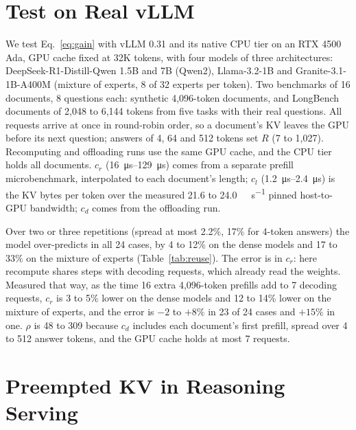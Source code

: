\documentclass[journal]{IEEEtran}
\begin{document}
\section{Test on Real vLLM}
\label{sec:real}
We test Eq.~\ref{eq:gain} with vLLM 0.31 and its native CPU tier on an RTX 4500 Ada, GPU cache fixed
at 32K tokens, with four models of three architectures: DeepSeek-R1-Distill-Qwen 1.5B and 7B
(Qwen2), Llama-3.2-1B and Granite-3.1-1B-A400M (mixture of experts, 8 of 32 experts per token). Two
benchmarks of 16 documents, 8 questions each: synthetic 4,096-token documents, and LongBench
documents of 2,048 to 6,144 tokens from five tasks with their real questions. All requests arrive at
once in round-robin order, so a document's KV leaves the GPU before its next question; answers of 4,
64 and 512 tokens set $R$ (7 to 1,027). Recomputing and offloading runs use the same GPU cache, and
the CPU tier holds all documents. $c_r$ (\SIrange{16}{129}{\micro\second}) comes from a separate
prefill microbenchmark, interpolated to each document's length; $c_l$ (\SIrange{1.2}{2.4}{\micro\second})
is the KV bytes per token over the measured 21.6 to \SI{24.0}{\giga\byte\per\second} pinned
host-to-GPU bandwidth; $c_d$ comes from the offloading run.

Over two or three repetitions (spread at most 2.2\%, 17\% for 4-token answers) the model
over-predicts in all 24 cases, by 4 to 12\% on the dense models and 17 to 33\% on the mixture of
experts (Table~\ref{tab:reuse}). The error is in $c_r$: here recompute shares steps with decoding
requests, which already read the weights. Measured that way, as the time 16 extra 4,096-token
prefills add to 7 decoding requests, $c_r$ is 3 to 5\% lower on the dense models and 12 to 14\%
lower on the mixture of experts, and the error is $-2$ to $+8\%$ in 23 of 24 cases and $+15\%$ in
one. $\rho$ is 48 to 309 because $c_d$ includes each document's first prefill, spread over 4 to 512
answer tokens, and the GPU cache holds at most 7 requests.

\begin{table}[t]
\centering
\caption{Real vLLM: gain of the CPU tier over recomputation for answers of 4, 64 and 512 tokens,
and the model's error with $c_r$ measured alone or alongside decoding.}
\label{tab:reuse}
\footnotesize
\setlength{\tabcolsep}{4pt}

\end{table}

\section{Preempted KV in Reasoning Serving}
\label{sec:preempt}
\end{document}
